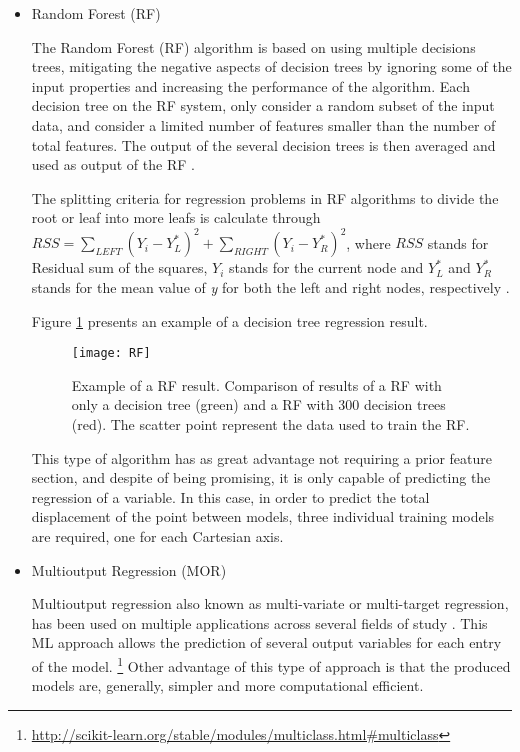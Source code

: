 \begin{itemize}
\item Random Forest (RF)

The Random Forest (RF) algorithm is based on using multiple decisions trees, mitigating the negative aspects of decision trees by ignoring some of the input properties and increasing the performance of the algorithm.
Each decision tree on the RF system, only consider a random subset of the input data, and consider a limited number of features smaller than the number of total features. The output of the several decision trees is then averaged and used as output of the RF \cite{Nygren2016}.

The splitting criteria for regression problems in RF algorithms to divide the root or leaf into more leafs is calculate through $ RSS = \sum_{LEFT} (Y_i - Y_{L}^{*})^{2} + \sum_{RIGHT} (Y_i - Y_{R}^{*})^{2}$, where $RSS$ stands for Residual sum of the squares, $Y_i$ stands for the current node and $Y_L^{*}$ and $Y_R^{*}$ stands for the mean value of \textit{y} for both the left and right nodes, respectively \cite{Cutler2013}.

Figure \ref{fig:RF} presents an example of a decision tree regression result.

\begin{figure}[!h]
\begin{center}
    \leavevmode
    \texttt{[image: RF]}
    \caption[Example of a RF result]{Example of a RF result. Comparison of results of a RF with only a decision tree (green) and a RF with 300 decision trees (red). The scatter point represent the data used to train the RF. \protect\footnotemark}
    \label{fig:RF}
  \end{center}
\end{figure}

This type of algorithm has as great advantage not requiring a prior feature section, and despite of being promising, it is only capable of predicting the regression of a variable. In this case, in order to predict the total displacement of the point between models, three individual training models are required, one for each Cartesian axis.

\item Multioutput Regression (MOR)

Multioutput regression also known as multi-variate or multi-target regression, has been used on multiple applications across several fields of study \cite{Borchani}. This ML approach allows the prediction of several output variables for each entry of the model. \footnote{\label{mor} \url{http://scikit-learn.org/stable/modules/multiclass.html\#multiclass}} Other advantage of this type of approach is that the produced models are, generally, simpler and more computational efficient.


\end{itemize}
